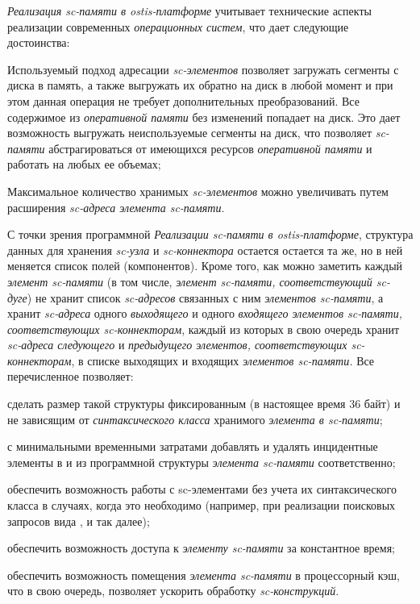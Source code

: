 \textit{Реализация sc-памяти в ostis-платформе} учитывает технические аспекты реализации современных \textit{операционных систем}, что дает следующие достоинства:
\begin{textitemize}
	\item Используемый подход адресации \textit{sc-элементов} позволяет загружать сегменты с диска в память, а также выгружать их обратно на диск в любой момент и при этом данная операция не требует дополнительных преобразований. Все содержимое из \textit{оперативной памяти} без изменений попадает на диск. Это дает возможность выгружать неиспользуемые сегменты на диск, что позволяет \textit{sc-памяти} абстрагироваться от имеющихся ресурсов \textit{оперативной памяти} и работать на любых ее объемах;
	\item Максимальное количество хранимых \textit{sc-элементов} можно увеличивать путем расширения \textit{sc-адреса элемента sc-памяти}.
\end{textitemize}

С точки зрения программной \textit{Реализации sc-памяти в ostis-платформе}, структура данных для хранения \textit{sc-узла} и \textit{sc-коннектора} остается остается та же, но в ней меняется список полей (компонентов). Кроме того, как можно заметить каждый \textit{элемент sc-памяти} (в том числе, \textit{элемент sc-памяти, соответствующий sc-дуге}) не хранит список \textit{sc-адресов} связанных с ним \textit{элементов sc-памяти}, а хранит \textit{sc-адреса} одного \textit{выходящего} и одного \textit{входящего элементов sc-памяти, соответствующих sc-коннекторам}, каждый из которых в свою очередь хранит \textit{sc-адреса следующего} и \textit{предыдущего элементов, соответствующих sc-коннекторам}, в списке выходящих и входящих \textit{элементов sc-памяти.} Все перечисленное позволяет:
\begin{textitemize}
	\item сделать размер такой структуры фиксированным (в настоящее время 36 байт) и не зависящим от \textit{синтаксического класса} хранимого \textit{элемента в sc-памяти\scnsupergroupsign};
	\item с минимальными временными затратами добавлять и удалять инцидентные элементы в и из программной структуры \textit{элемента sc-памяти} соответственно;
	\item обеспечить возможность работы с sc-элементами без учета их синтаксического класса в случаях, когда это необходимо (например, при реализации поисковых запросов вида ,  и так далее);
	\item обеспечить возможность доступа к \textit{элементу sc-памяти} за константное время;
	\item обеспечить возможность помещения \textit{элемента sc-памяти} в процессорный кэш, что в свою очередь, позволяет ускорить обработку \textit{sc-конструкций}.
\end{textitemize}

